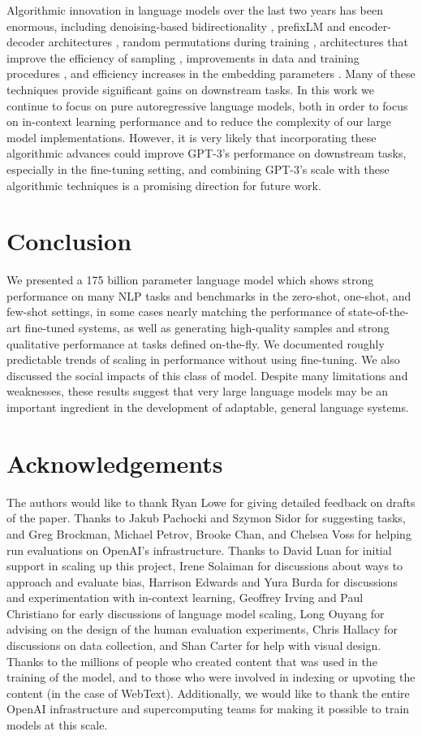 \documentclass{article}
\begin{document}
Algorithmic innovation in language models over the last two years has been enormous, including denoising-based bidirectionality \cite{devlin2018bert}, prefixLM \cite{dai2015semi} and encoder-decoder architectures \cite{lewis2019bart,raffel2019t5}, random permutations during training \cite{yang2019xlnet}, architectures that improve the efficiency of sampling \cite{dai2019transformerXL}, improvements in data and training procedures \cite{liu2019roberta}, and efficiency increases in the embedding parameters \cite{lan2019albert}.  Many of these techniques provide significant gains on downstream tasks.  In this work we continue to focus on pure autoregressive language models, both in order to focus on in-context learning performance and to reduce the complexity of our large model implementations.  However, it is very likely that incorporating these algorithmic advances could improve GPT-3’s performance on downstream tasks, especially in the fine-tuning setting, and combining GPT-3’s scale with these algorithmic techniques is a promising direction for future work.

\section{Conclusion}
\label{section:Conclusion}
We presented a 175 billion parameter language model which shows strong performance on many NLP tasks and benchmarks in the zero-shot, one-shot, and few-shot settings, in some cases nearly matching the performance of state-of-the-art fine-tuned systems, as well as generating high-quality samples and strong qualitative performance at tasks defined on-the-fly.  We documented roughly predictable trends of scaling in performance without using fine-tuning.  We also discussed the social impacts of this class of model.  Despite many limitations and weaknesses, these results suggest that very large language models may be an important ingredient in the development of adaptable, general language systems.

\section*{Acknowledgements}
The authors would like to thank Ryan Lowe for giving detailed feedback on drafts of the paper.  Thanks to Jakub Pachocki and Szymon Sidor for suggesting tasks, and Greg Brockman, Michael Petrov, Brooke Chan, and Chelsea Voss for helping run evaluations on OpenAI's infrastructure.  Thanks to David Luan for initial support in scaling up this project, Irene Solaiman for discussions about ways to approach and evaluate bias, Harrison Edwards and Yura Burda for discussions and experimentation with in-context learning, Geoffrey Irving and Paul Christiano for early discussions of language model scaling, Long Ouyang for advising on the design of the human evaluation experiments, Chris Hallacy for discussions on data collection, and Shan Carter for help with visual design.  Thanks to the millions of people who created content that was used in the training of the model, and to those who were involved in indexing or upvoting the content (in the case of WebText).  Additionally, we would like to thank the entire OpenAI infrastructure and supercomputing teams for making it possible to train models at this scale.
\newpage
\end{document}
